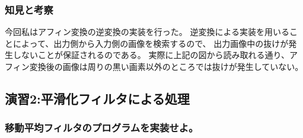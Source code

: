 ﻿\documentclass[a4j,11pt]{jarticle}
\begin{document}
\subsubsection{知見と考察}
今回私はアフィン変換の逆変換の実装を行った。
逆変換による実装を用いることによって、出力側から入力側の画像を検索するので、
出力画像中の抜けが発生しないことが保証されるのである。
実際に上記の図から読み取れる通り、アフィン変換後の画像は周りの黒い画素以外のところでは抜けが発生していない。
%
%

%
\subsection{演習2:平滑化フィルタによる処理}

\subsubsection{移動平均フィルタのプログラムを実装せよ。}
\end{document}
